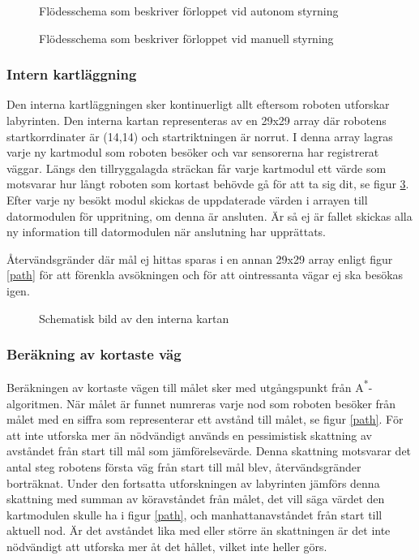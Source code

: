 \documentclass[11pt]{article}
\begin{document}
\begin{flushleft}
\begin{figure}[htbp]
\centering
\noindent\resizebox{0.9\linewidth}{!}{
	}
	\cprotect\caption{Flödesschema som beskriver förloppet vid autonom styrning \label{autonomousMode}}	
\end{figure}

\begin{figure}[htbp]
\centering
\noindent\resizebox{0.9\linewidth}{!}{
	}
	\cprotect\caption{Flödesschema som beskriver förloppet vid manuell styrning \label{manualMode}}	
\end{figure}

\subsubsection{Intern kartläggning} \label{search}
Den interna kartläggningen sker kontinuerligt allt eftersom roboten utforskar labyrinten. Den interna kartan representeras av en 29x29 array där robotens startkorrdinater är (14,14) och startriktningen är norrut. I denna array lagras varje ny kartmodul som roboten besöker och var sensorerna har registrerat väggar. Längs den tillryggalagda sträckan får varje kartmodul ett värde som motsvarar hur långt roboten som kortast behövde gå för att ta sig dit, se figur \ref{map}. Efter varje ny besökt modul skickas de uppdaterade värden i arrayen till datormodulen för uppritning, om denna är ansluten. Är så ej är fallet skickas alla ny information till datormodulen när anslutning har upprättats. 

Återvändsgränder där mål ej hittas sparas i en annan 29x29 array enligt figur \ref{path} för att förenkla avsökningen och för att ointressanta vägar ej ska besökas igen.

\begin{figure}[htbp]
\centering
\noindent\resizebox{0.7\linewidth}{!}{
	}
	\caption{Schematisk bild av den interna kartan}	\label{map}
\end{figure}

\subsubsection{Beräkning av kortaste väg} \label{shortestPath}
Beräkningen av kortaste vägen till målet sker med utgångspunkt från A\textsuperscript{*}-algoritmen. När målet är funnet numreras varje nod som roboten besöker från målet med en siffra som representerar ett avstånd till målet, se figur \ref{path}. För att inte utforska mer än nödvändigt används en pessimistisk skattning av avståndet från start till mål som jämförelsevärde. Denna skattning motsvarar det antal steg robotens första väg från start till mål blev, återvändsgränder borträknat. Under den fortsatta utforskningen av labyrinten jämförs denna skattning med summan av köravståndet från målet, det vill säga värdet den kartmodulen skulle ha i figur \ref{path}, och manhattanavståndet från start till aktuell nod. Är det avståndet lika med eller större än skattningen är det inte nödvändigt att utforska mer åt det hållet, vilket inte heller görs.


\end{flushleft}
\end{document}
